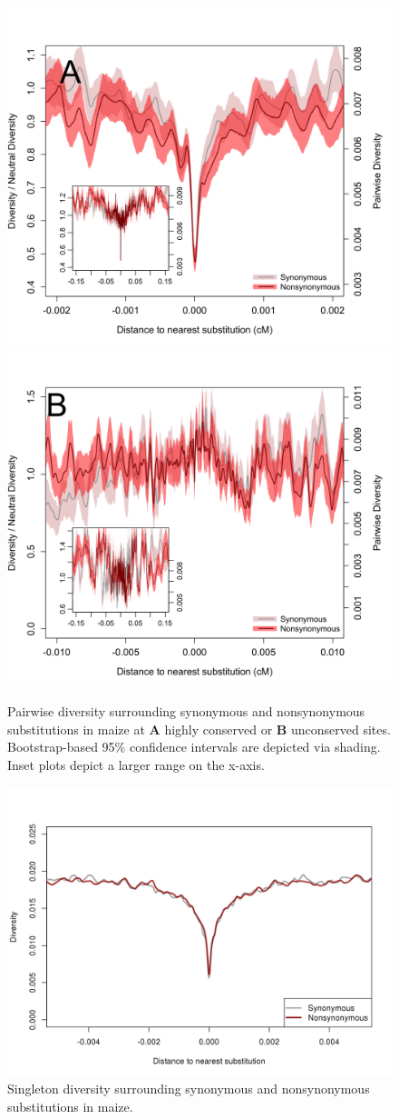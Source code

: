 \documentclass[12pt,a4paper]{article}
\begin{document}
\begin{figure}
  \includegraphics[width=.5\textwidth]{FigsAndFiles/plotDiversity_TvM_Conserved_Significance_June.png}
  \includegraphics[width=.5\textwidth]{FigsAndFiles/plotDiversity_TvM_Unconserved_Significance_June.png}
\caption{ Pairwise diversity surrounding synonymous and nonsynonymous
  substitutions in maize at \textbf{A} highly conserved or \textbf{B}  unconserved sites.  Bootstrap-based 95\% confidence intervals are depicted via shading. Inset plots depict a larger range on the x-axis. \label{sFig:consUncons}}
\end{figure}
\clearpage

\begin{figure}
  \includegraphics[width=\textwidth]{FigsAndFiles/plotDiversity_TvM_Singletons.png}
\caption{ Singleton diversity surrounding synonymous and nonsynonymous
  substitutions in maize. \label{sFig:singleton}}
\end{figure}
\clearpage
\end{document}
